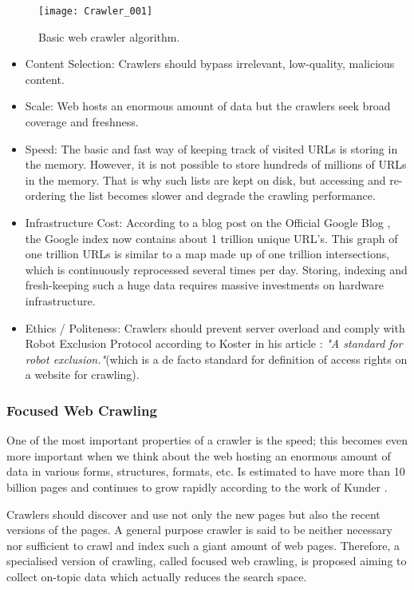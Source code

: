 	\begin{figure}\centering
		\texttt{[image: Crawler\_001]}
		\caption{Basic web crawler algorithm.}\label{fig:Crawler_001}
	\end{figure}
		
	\begin{itemize}
		\item Content Selection: Crawlers should bypass irrelevant, low-quality, malicious content.
		\item Scale: Web hosts an enormous amount of data but the crawlers seek broad coverage and freshness.
		\item Speed: The basic and fast way of keeping track of visited URLs is storing in the memory. However, it is not possible to store hundreds of millions of URLs in the memory. That is why such lists are kept on disk, but accessing and re-ordering the list becomes slower and degrade the crawling performance.
		\item Infrastructure Cost: According to a blog post on the Official Google Blog \cite{A2013}, the Google index now contains about 1 trillion unique URL's. This graph of one trillion URLs is similar to a map made up of one trillion intersections, which is continuously reprocessed several times per day. Storing, indexing and fresh-keeping such a huge data requires massive investments on hardware infrastructure.
		\item Ethics / Politeness: Crawlers should prevent server overload and comply with Robot Exclusion Protocol according to Koster in his article \cite{K2013}: \emph{"A standard for robot exclusion."}(which is a de facto standard for definition of access rights on a website for crawling).
	\end{itemize}
	
	\subsubsection{Focused Web Crawling}\label{focusedWebCrawling}

	One of the most important properties of a crawler is the speed; this becomes even more important when we think about the web hosting an enormous amount of data in various forms, structures, formats, etc. Is estimated to have more than 10 billion pages and continues to grow rapidly according to the work of Kunder \cite{WWW2013}. 
	
	
	Crawlers should discover and use not only the new pages but also the recent versions of the pages. A general purpose crawler is said to be neither necessary nor sufficient to crawl and index such a giant amount of web pages. Therefore, a specialised version of crawling, called focused web crawling, is proposed aiming to collect on-topic data which actually reduces the search space.
	
